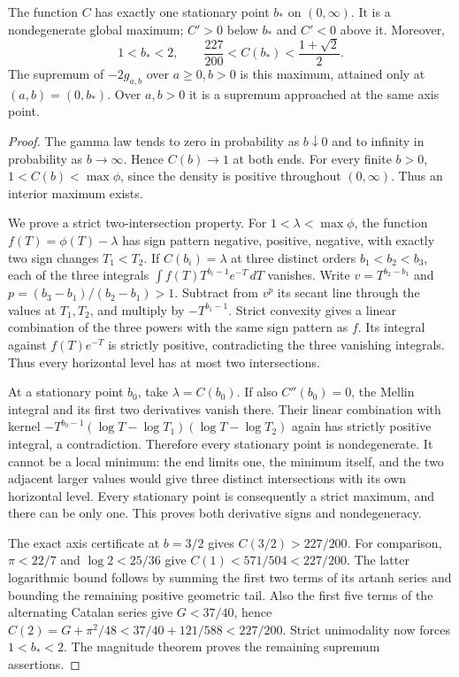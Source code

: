 \begin{theorem}
\label{subpick:thm:axis-maximum}
The function $C$ has exactly one stationary point $b_*$ on $(0,\infty)$.
It is a nondegenerate global maximum; $C'>0$ below $b_*$ and $C'<0$
above it. Moreover,
\[
 1<b_*<2,\qquad \frac{227}{200}<C(b_*)<\frac{1+\sqrt2}{2}.
\]
The supremum of $-2g_{a,b}$ over $a\ge0,b>0$ is this maximum,
attained only at $(a,b)=(0,b_*)$. Over $a,b>0$ it is a supremum
approached at the same axis point.
\end{theorem}
\begin{proof}
The gamma law tends to zero in probability as $b\downarrow0$ and
to infinity in probability as $b\to\infty$. Hence $C(b)\to1$ at
both ends. For every finite $b>0$, $1<C(b)<\max\phi$, since the
density is positive throughout $(0,\infty)$. Thus an interior maximum exists.

We prove a strict two-intersection property. For
$1<\lambda<\max\phi$, the function
$f(T)=\phi(T)-\lambda$ has sign pattern negative, positive, negative,
with exactly two sign changes $T_1<T_2$. If $C(b_i)=\lambda$ at
three distinct orders $b_1<b_2<b_3$, each of the three integrals
$\int f(T)T^{b_i-1}e^{-T}\,dT$ vanishes. Write
$v=T^{b_2-b_1}$ and $p=(b_3-b_1)/(b_2-b_1)>1$.
Subtract from $v^p$ its secant line through the values at $T_1,T_2$,
and multiply by $-T^{b_1-1}$. Strict convexity gives a linear
combination of the three powers with the same sign pattern as $f$.
Its integral against $f(T)e^{-T}$ is strictly positive, contradicting
the three vanishing integrals. Thus every horizontal level has at most
two intersections.

At a stationary point $b_0$, take $\lambda=C(b_0)$. If also
$C''(b_0)=0$, the Mellin integral and its first two derivatives
vanish there. Their linear combination with kernel
$-T^{b_0-1}(\log T-\log T_1)(\log T-\log T_2)$ again has strictly
positive integral, a contradiction. Therefore every stationary point
is nondegenerate. It cannot be a local minimum: the end limits one,
the minimum itself, and the two adjacent larger values would give
three distinct intersections with its own horizontal level. Every
stationary point is consequently a strict maximum, and there can be
only one. This proves both derivative signs and nondegeneracy.

The exact axis certificate at $b=3/2$ gives $C(3/2)>227/200$.
For comparison, $\pi<22/7$ and $\log2<25/36$ give
$C(1)<571/504<227/200$. The latter logarithmic bound follows by
summing the first two terms of its artanh series and bounding the
remaining positive geometric tail. Also the first five terms of the
alternating Catalan series give $G<37/40$, hence
$C(2)=G+\pi^2/48<37/40+121/588<227/200$.
Strict unimodality now forces $1<b_*<2$. The magnitude theorem proves
the remaining supremum assertions.
\end{proof}

